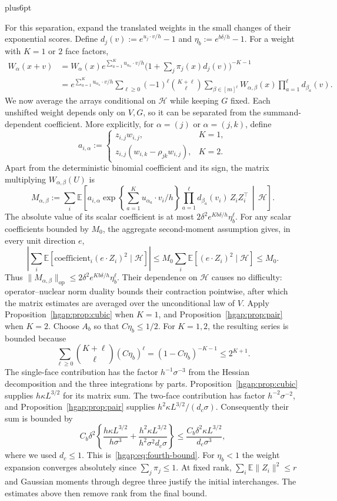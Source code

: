 \documentclass[11pt,letterpaper,twoside,leqno]{article}
\makeatletter
\theoremstyle{bookplain}
\theoremstyle{bookremark}
\renewenvironment{proof}[1][\proofname]{\par
  \pushQED{\qed}\normalfont\topsep6pt plus6pt\relax
  \trivlist\item[\hskip\labelsep\bfseries #1\@addpunct{.}]\ignorespaces
}{\popQED\endtrivlist\@endpefalse}
\newcommand{\E}{\mathbb E}
\newcommand{\op}{\mathrm{op}}
\makeatother
\begin{document}
\begin{proof}
For this separation, expand the translated weights in the small
changes of their exponential scores. Define
$d_j(v):=e^{u_j\cdot v/h}-1$ and
$\eta_b:=e^{b\delta/h}-1$. For a weight with $K=1$ or $2$ face factors,
\begin{align*}
 W_\alpha(x+v)
 &=W_\alpha(x)e^{\sum_{a=1}^K u_{\alpha_a}\cdot v/h}
     \bigl(1+\sum_j\pi_j(x)d_j(v)\bigr)^{-K-1}\\
 &=e^{\sum_{a=1}^K u_{\alpha_a}\cdot v/h}
   \sum_{\ell\ge0}(-1)^\ell\binom{K+\ell}{\ell}
   \sum_{\beta\in[m]^\ell}W_{\alpha,\beta}(x)
                       \prod_{a=1}^\ell d_{\beta_a}(v).
\end{align*}
We now average the arrays conditional on $\mathcal H$ while keeping
$G$ fixed. Each unshifted weight depends only on $V,G$, so it can be
separated from the summand-dependent coefficient. More explicitly,
for $\alpha=(j)$ or $\alpha=(j,k)$, define
\[
 a_{i,\alpha}:=
 \begin{cases}
 z_{i,j}w_{i,j},&K=1,\\
 z_{i,j}(w_{i,k}-\rho_{jk}w_{i,j}),&K=2.
 \end{cases}
\]
Apart from the deterministic binomial coefficient and its sign, the
matrix multiplying $W_{\alpha,\beta}(U)$ is
\[
 M_{\alpha,\beta}:=\sum_i\E\left[
 a_{i,\alpha}\exp\!\left\{\sum_{a=1}^K u_{\alpha_a}\cdot v_i/h\right\}
 \prod_{a=1}^\ell d_{\beta_a}(v_i)\,Z_iZ_i^\top
 \,\middle|\,\mathcal H\right].
\]
The absolute value of its scalar coefficient is at most
$2\delta^2e^{Kb\delta/h}\eta_b^\ell$.
For any scalar coefficients bounded by $M_0$, the aggregate
second-moment assumption gives, in every unit direction $e$,
\[
 \left|\sum_i\E[\text{coefficient}_i(e\cdot Z_i)^2
                       \mid\mathcal H]\right|
 \le M_0\sum_i\E[(e\cdot Z_i)^2\mid\mathcal H]\le M_0.
\]
Thus $\|M_{\alpha,\beta}\|_{\op}\le
2\delta^2e^{Kb\delta/h}\eta_b^\ell$.
Their dependence on $\mathcal H$ causes no difficulty: operator--nuclear
norm duality bounds their contraction pointwise, after which the matrix
estimates are averaged over the unconditional law of $V$.
Apply Proposition~\ref{hgap:prop:cubic} when $K=1$, and
Proposition~\ref{hgap:prop:pair} when $K=2$.
Choose $A_b$ so that $C\eta_b\le1/2$.
For $K=1,2$, the resulting series is bounded because
\[
 \sum_{\ell\ge0}\binom{K+\ell}{\ell}(C\eta_b)^\ell
       =(1-C\eta_b)^{-K-1}\le2^{K+1}.
\]
The single-face contribution has the factor $h^{-1}\sigma^{-3}$
from the Hessian decomposition and the three integrations by parts.
Proposition~\ref{hgap:prop:cubic} supplies $h\kappa L^{3/2}$ for its matrix sum.
The two-face contribution has factor $h^{-2}\sigma^{-2}$, and
Proposition~\ref{hgap:prop:pair} supplies $h^2\kappa L^{3/2}/(d_c\sigma)$.
Consequently their sum is bounded by
\[
 C_b\delta^2\left\{\frac{h\kappa L^{3/2}}{h\sigma^3}
             +\frac{h^2\kappa L^{3/2}}{h^2\sigma^2d_c\sigma}\right\}
 \le\frac{C_b\delta^2\kappa L^{3/2}}{d_c\sigma^3},
\]
where we used $d_c\le1$. This is~\eqref{hgap:eq:fourth-bound}.
For $\eta_b<1$ the weight expansion converges absolutely since
$\sum_j\pi_j\le1$. At fixed rank, $\sum_i\E\|Z_i\|^2\le r$ and
Gaussian moments through degree three justify the initial interchanges.
The estimates above then remove rank from the final bound.
\end{proof}
\end{document}
